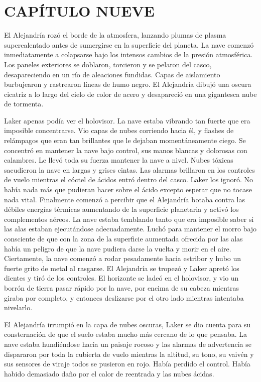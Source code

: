 \chapter*{CAPÍTULO NUEVE}

{El Alejandría rozó el borde de la atmosfera, lanzando plumas de plasma
 supercalentado antes de sumergirse en la superficie del planeta. La nave
 comenzó inmediatamente a colapsarse bajo los intensos cambios de la
 presión atmosférica. Los paneles exteriores se doblaron, torcieron y se
 pelaron del casco, desapareciendo en un río de aleaciones fundidas.
 Capas de aislamiento burbujearon y rastrearon líneas de humo negro. El
 Alejandría dibujó una oscura cicatriz a lo largo del cielo de color de
acero y desapareció en una gigantesca nube de tormenta.}

{Laker apenas podía ver el holovisor. La nave estaba vibrando tan fuerte
 que era imposible concentrarse. Vio capas de nubes corriendo hacia él, y
 flashes de relámpagos que eran tan brillantes que le dejaban
 momentáneamente ciego. Se concentró en mantener la nave bajo control,
 sus manos blancas y dolorosas con calambres. Le llevó toda su fuerza
 mantener la nave a nivel. Nubes tóxicas sacudieron la nave en largas y
 grises cintas. Las alarmas brillaron en los controles de vuelo mientras
 el cóctel de ácidos entró dentro del casco. Laker los ignoró. No había
 nada más que pudieran hacer sobre el ácido excepto esperar que no tocase
 nada vital. Finalmente comenzó a percibir que el Alejandría botaba
 contra las débiles energías térmicas aumentando de la superficie
 planetaria y activó los complementos aéreos. La nave estaba temblando
 tanto que era imposible saber si las alas estaban ejecutándose
 adecuadamente. Luchó para mantener el morro bajo consciente de que con
 la zona de la superficie aumentada ofrecida por las alas había un
 peligro de que la nave pudiera darse la vuelta y morir en el aire.
 Ciertamente, la nave comenzó a rodar pesadamente hacia estribor y hubo
 un fuerte grito de metal al rasgarse. El Alejandría se tropezó y Laker
 apretó los dientes y tiró de los controles. El horizonte se ladeó en el
 holovisor, y vio un borrón de tierra pasar rápido por la nave, por
 encima de su cabeza mientras giraba por completo, y entonces deslizarse
por el otro lado mientras intentaba nivelarlo.}

{El Alejandría irrumpió en la capa de nubes oscuras, Laker se dio cuenta
 para su consternación de que el suelo estaba mucho más cercano de lo que
 pensaba. La nave estaba hundiéndose hacia un paisaje rocoso y las
 alarmas de advertencia se dispararon por toda la cubierta de vuelo
 mientras la altitud, su tono, su vaivén y sus sensores de viraje todos
 se pusieron en rojo. Había perdido el control. Había habido demasiado
daño por el calor de reentrada y las nubes ácidas.}

